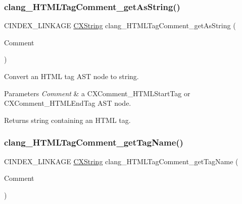 \subsubsection{\texorpdfstring{clang\+\_\+\+H\+T\+M\+L\+Tag\+Comment\+\_\+get\+As\+String()}{clang\_HTMLTagComment\_getAsString()}}
{\footnotesize\ttfamily C\+I\+N\+D\+E\+X\+\_\+\+L\+I\+N\+K\+A\+GE \hyperlink{structCXString}{C\+X\+String} clang\+\_\+\+H\+T\+M\+L\+Tag\+Comment\+\_\+get\+As\+String (\begin{DoxyParamCaption}\item[{\hyperlink{structCXComment}{C\+X\+Comment}}]{Comment }\end{DoxyParamCaption})}



Convert an H\+T\+ML tag A\+ST node to string. 


\begin{DoxyParams}{Parameters}
{\em Comment} & a {\ttfamily C\+X\+Comment\+\_\+\+H\+T\+M\+L\+Start\+Tag} or {\ttfamily C\+X\+Comment\+\_\+\+H\+T\+M\+L\+End\+Tag} A\+ST node.\\
\hline
\end{DoxyParams}
\begin{DoxyReturn}{Returns}
string containing an H\+T\+ML tag. 
\end{DoxyReturn}
\mbox{\label{group__CINDEX__COMMENT_ga55b84483c67c0629260b1534d4b3f80e}} 
\subsubsection{\texorpdfstring{clang\+\_\+\+H\+T\+M\+L\+Tag\+Comment\+\_\+get\+Tag\+Name()}{clang\_HTMLTagComment\_getTagName()}}
{\footnotesize\ttfamily C\+I\+N\+D\+E\+X\+\_\+\+L\+I\+N\+K\+A\+GE \hyperlink{structCXString}{C\+X\+String} clang\+\_\+\+H\+T\+M\+L\+Tag\+Comment\+\_\+get\+Tag\+Name (\begin{DoxyParamCaption}\item[{\hyperlink{structCXComment}{C\+X\+Comment}}]{Comment }\end{DoxyParamCaption})}


